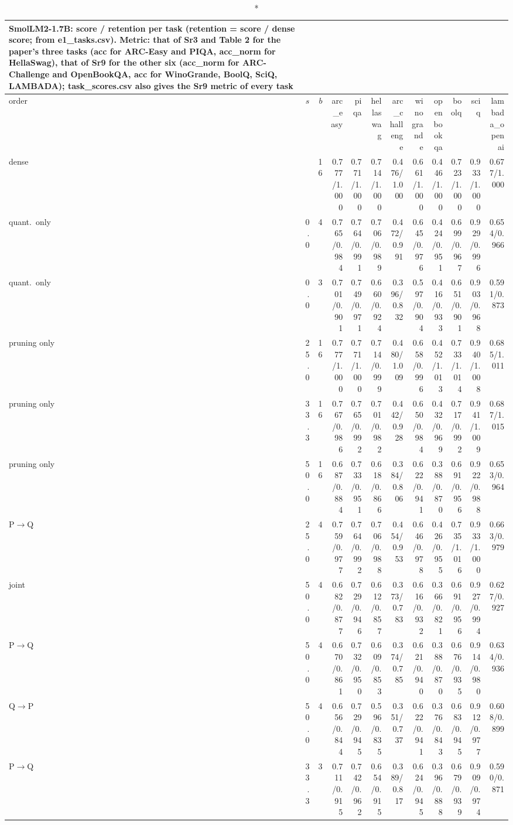 \documentclass{article}
\begin{document}
\begin{longtable}{lrrrrrrrrrrr}
\caption*{SmolLM2-1.7B: score / retention per task (retention = score / dense score; from e1\_tasks.csv). Metric: that of Sr3 and Table 2 for the paper's three tasks (acc for ARC-Easy and PIQA, acc\_norm for HellaSwag), that of Sr9 for the other six (acc\_norm for ARC-Challenge and OpenBookQA, acc for WinoGrande, BoolQ, SciQ, LAMBADA); task\_scores.csv also gives the Sr9 metric of every task}\\
\toprule order & $s$ & $b$ & arc\_easy & piqa & hellaswag & arc\_challenge & winogrande & openbookqa & boolq & sciq & lambada\_openai \\ \midrule \endhead
dense &  & 16 & 0.777/1.000 & 0.771/1.000 & 0.714/1.000 & 0.476/1.000 & 0.661/1.000 & 0.446/1.000 & 0.723/1.000 & 0.933/1.000 & 0.677/1.000 \\
quant.\ only & 0.0 & 4 & 0.765/0.984 & 0.764/0.991 & 0.706/0.989 & 0.472/0.991 & 0.645/0.976 & 0.424/0.951 & 0.699/0.967 & 0.929/0.996 & 0.654/0.966 \\
quant.\ only & 0.0 & 3 & 0.701/0.901 & 0.749/0.971 & 0.660/0.924 & 0.396/0.832 & 0.597/0.904 & 0.416/0.933 & 0.651/0.901 & 0.903/0.968 & 0.591/0.873 \\
pruning only & 25.0 & 16 & 0.777/1.000 & 0.771/1.000 & 0.714/0.999 & 0.480/1.009 & 0.658/0.996 & 0.452/1.013 & 0.733/1.014 & 0.940/1.008 & 0.685/1.011 \\
pruning only & 33.3 & 16 & 0.767/0.986 & 0.765/0.992 & 0.701/0.982 & 0.442/0.928 & 0.650/0.984 & 0.432/0.969 & 0.717/0.992 & 0.941/1.009 & 0.687/1.015 \\
pruning only & 50.0 & 16 & 0.687/0.884 & 0.733/0.951 & 0.618/0.866 & 0.384/0.806 & 0.622/0.941 & 0.388/0.870 & 0.691/0.956 & 0.922/0.988 & 0.653/0.964 \\
P$\to$Q & 25.0 & 4 & 0.759/0.977 & 0.764/0.992 & 0.706/0.988 & 0.454/0.953 & 0.646/0.978 & 0.426/0.955 & 0.735/1.016 & 0.933/1.000 & 0.663/0.979 \\
joint & 50.0 & 4 & 0.682/0.877 & 0.729/0.946 & 0.612/0.857 & 0.373/0.783 & 0.616/0.932 & 0.366/0.821 & 0.691/0.956 & 0.927/0.994 & 0.627/0.927 \\
P$\to$Q & 50.0 & 4 & 0.670/0.861 & 0.732/0.950 & 0.609/0.853 & 0.374/0.785 & 0.621/0.940 & 0.388/0.870 & 0.676/0.935 & 0.914/0.980 & 0.634/0.936 \\
Q$\to$P & 50.0 & 4 & 0.656/0.844 & 0.729/0.945 & 0.596/0.835 & 0.351/0.737 & 0.622/0.941 & 0.376/0.843 & 0.683/0.945 & 0.912/0.977 & 0.608/0.899 \\
P$\to$Q & 33.3 & 3 & 0.711/0.915 & 0.742/0.962 & 0.654/0.915 & 0.389/0.817 & 0.624/0.945 & 0.396/0.888 & 0.679/0.939 & 0.909/0.974 & 0.590/0.871 \\
\bottomrule\end{longtable}
\end{document}
